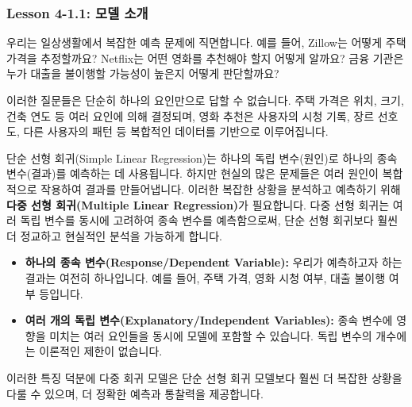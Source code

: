 \documentclass[11pt,a4paper]{book}
\theoremstyle{definition}
\begin{document}
\subsubsection{Lesson 4-1.1: 모델 소개}

\begin{tcolorbox}[title={\textbf{다중 선형 회귀의 필요성}}]
우리는 일상생활에서 복잡한 예측 문제에 직면합니다. 예를 들어, Zillow는 어떻게 주택 가격을 추정할까요? Netflix는 어떤 영화를 추천해야 할지 어떻게 알까요? 금융 기관은 누가 대출을 불이행할 가능성이 높은지 어떻게 판단할까요?

이러한 질문들은 단순히 하나의 요인만으로 답할 수 없습니다. 주택 가격은 위치, 크기, 건축 연도 등 여러 요인에 의해 결정되며, 영화 추천은 사용자의 시청 기록, 장르 선호도, 다른 사용자의 패턴 등 복합적인 데이터를 기반으로 이루어집니다.

단순 선형 회귀(Simple Linear Regression)는 하나의 독립 변수(원인)로 하나의 종속 변수(결과)를 예측하는 데 사용됩니다. 하지만 현실의 많은 문제들은 여러 원인이 복합적으로 작용하여 결과를 만들어냅니다. 이러한 복잡한 상황을 분석하고 예측하기 위해 \textbf{다중 선형 회귀(Multiple Linear Regression)}가 필요합니다. 다중 선형 회귀는 여러 독립 변수를 동시에 고려하여 종속 변수를 예측함으로써, 단순 선형 회귀보다 훨씬 더 정교하고 현실적인 분석을 가능하게 합니다.
\end{tcolorbox}

\begin{tcolorbox}[title={\textbf{다중 선형 회귀 모델의 특징}}]
\begin{itemize}
    \item \textbf{하나의 종속 변수(Response/Dependent Variable):} 우리가 예측하고자 하는 결과는 여전히 하나입니다. 예를 들어, 주택 가격, 영화 시청 여부, 대출 불이행 여부 등입니다.
    \item \textbf{여러 개의 독립 변수(Explanatory/Independent Variables):} 종속 변수에 영향을 미치는 여러 요인들을 동시에 모델에 포함할 수 있습니다. 독립 변수의 개수에는 이론적인 제한이 없습니다.
\end{itemize}
이러한 특징 덕분에 다중 회귀 모델은 단순 선형 회귀 모델보다 훨씬 더 복잡한 상황을 다룰 수 있으며, 더 정확한 예측과 통찰력을 제공합니다.
\end{tcolorbox}
\end{document}
